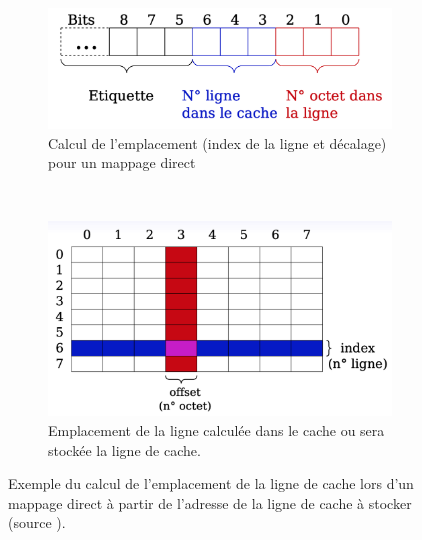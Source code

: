             \begin{figure}
                \centering
                \begin{subfigure}[b]{0.45\linewidth}
                    \includegraphics[width=\linewidth]{images/cache_calcul.png}
                    \caption{Calcul de l'emplacement (index de la ligne et décalage) pour un mappage direct}
                    \label{pic:cache_calcul}
                \end{subfigure}
                ~ %
                \begin{subfigure}[b]{0.45\linewidth}
                    \includegraphics[width=\linewidth]{images/cache_direct_coucou.png}
                    \caption{Emplacement de la ligne calculée dans le cache ou sera stockée la ligne de cache.}
                    \label{pic:cache_direct_coucou}
                \end{subfigure}
                \caption{Exemple du calcul de l'emplacement de la ligne de cache lors d'un mappage direct à partir de l'adresse de la ligne de cache à stocker (source \cite{Meunier2017}). }\label{fig:cachemappage}
            \end{figure}
        
